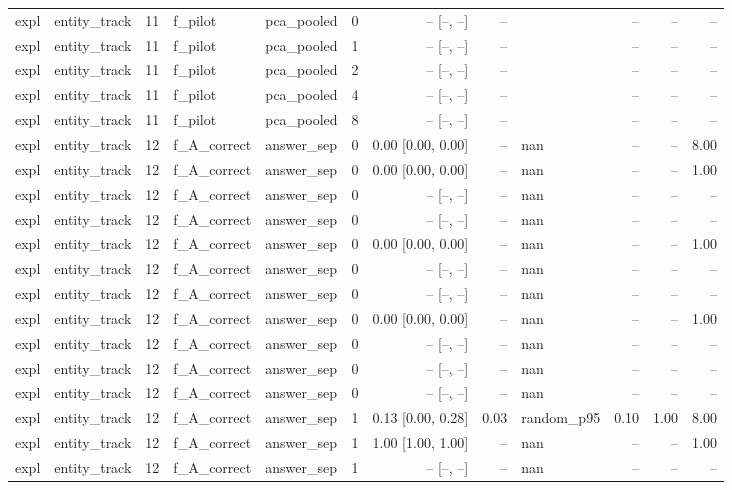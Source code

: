 \begin{tabular}{llrllrrrlrrr}
expl & entity\_track & 11 & f\_pilot & pca\_pooled & 0 & -- [--, --] & -- &  & -- & -- & -- \\
expl & entity\_track & 11 & f\_pilot & pca\_pooled & 1 & -- [--, --] & -- &  & -- & -- & -- \\
expl & entity\_track & 11 & f\_pilot & pca\_pooled & 2 & -- [--, --] & -- &  & -- & -- & -- \\
expl & entity\_track & 11 & f\_pilot & pca\_pooled & 4 & -- [--, --] & -- &  & -- & -- & -- \\
expl & entity\_track & 11 & f\_pilot & pca\_pooled & 8 & -- [--, --] & -- &  & -- & -- & -- \\
expl & entity\_track & 12 & f\_A\_correct & answer\_sep & 0 & 0.00 [0.00, 0.00] & -- & nan & -- & -- & 8.00 \\
expl & entity\_track & 12 & f\_A\_correct & answer\_sep & 0 & 0.00 [0.00, 0.00] & -- & nan & -- & -- & 1.00 \\
expl & entity\_track & 12 & f\_A\_correct & answer\_sep & 0 & -- [--, --] & -- & nan & -- & -- & -- \\
expl & entity\_track & 12 & f\_A\_correct & answer\_sep & 0 & -- [--, --] & -- & nan & -- & -- & -- \\
expl & entity\_track & 12 & f\_A\_correct & answer\_sep & 0 & 0.00 [0.00, 0.00] & -- & nan & -- & -- & 1.00 \\
expl & entity\_track & 12 & f\_A\_correct & answer\_sep & 0 & -- [--, --] & -- & nan & -- & -- & -- \\
expl & entity\_track & 12 & f\_A\_correct & answer\_sep & 0 & -- [--, --] & -- & nan & -- & -- & -- \\
expl & entity\_track & 12 & f\_A\_correct & answer\_sep & 0 & 0.00 [0.00, 0.00] & -- & nan & -- & -- & 1.00 \\
expl & entity\_track & 12 & f\_A\_correct & answer\_sep & 0 & -- [--, --] & -- & nan & -- & -- & -- \\
expl & entity\_track & 12 & f\_A\_correct & answer\_sep & 0 & -- [--, --] & -- & nan & -- & -- & -- \\
expl & entity\_track & 12 & f\_A\_correct & answer\_sep & 0 & -- [--, --] & -- & nan & -- & -- & -- \\
expl & entity\_track & 12 & f\_A\_correct & answer\_sep & 1 & 0.13 [0.00, 0.28] & 0.03 & random\_p95 & 0.10 & 1.00 & 8.00 \\
expl & entity\_track & 12 & f\_A\_correct & answer\_sep & 1 & 1.00 [1.00, 1.00] & -- & nan & -- & -- & 1.00 \\
expl & entity\_track & 12 & f\_A\_correct & answer\_sep & 1 & -- [--, --] & -- & nan & -- & -- & -- \\

\end{tabular}
